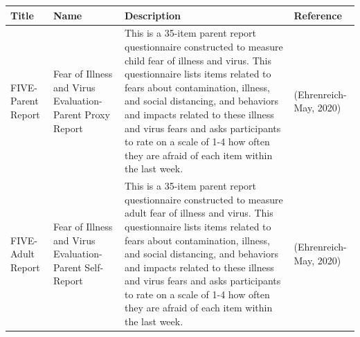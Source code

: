 \documentclass[]{book}
\begin{document}
\begin{longtable}[]{@{}llll@{}}
\toprule
\begin{minipage}[b]{0.13\columnwidth}\raggedright
Title\strut
\end{minipage} & \begin{minipage}[b]{0.21\columnwidth}\raggedright
Name\strut
\end{minipage} & \begin{minipage}[b]{0.38\columnwidth}\raggedright
Description\strut
\end{minipage} & \begin{minipage}[b]{0.15\columnwidth}\raggedright
Reference\strut
\end{minipage}\tabularnewline
\midrule
\endhead
\begin{minipage}[t]{0.13\columnwidth}\raggedright
FIVE-Parent Report\strut
\end{minipage} & \begin{minipage}[t]{0.21\columnwidth}\raggedright
Fear of Illness and Virus Evaluation- Parent Proxy Report\strut
\end{minipage} & \begin{minipage}[t]{0.38\columnwidth}\raggedright
This is a 35-item parent report questionnaire constructed to measure child fear of illness and virus. This questionnaire lists items related to fears about contamination, illness, and social distancing, and behaviors and impacts related to these illness and virus fears and asks participants to rate on a scale of 1-4 how often they are afraid of each item within the last week.\strut
\end{minipage} & \begin{minipage}[t]{0.15\columnwidth}\raggedright
(Ehrenreich-May, 2020)\strut
\end{minipage}\tabularnewline
\begin{minipage}[t]{0.13\columnwidth}\raggedright
FIVE- Adult Report\strut
\end{minipage} & \begin{minipage}[t]{0.21\columnwidth}\raggedright
Fear of Illness and Virus Evaluation- Parent Self-Report\strut
\end{minipage} & \begin{minipage}[t]{0.38\columnwidth}\raggedright
This is a 35-item parent report questionnaire constructed to measure adult fear of illness and virus. This questionnaire lists items related to fears about contamination, illness, and social distancing, and behaviors and impacts related to these illness and virus fears and asks participants to rate on a scale of 1-4 how often they are afraid of each item within the last week.\strut
\end{minipage} & \begin{minipage}[t]{0.15\columnwidth}\raggedright
(Ehrenreich-May, 2020)\strut
\end{minipage}\tabularnewline
\bottomrule
\end{longtable}
\end{document}
